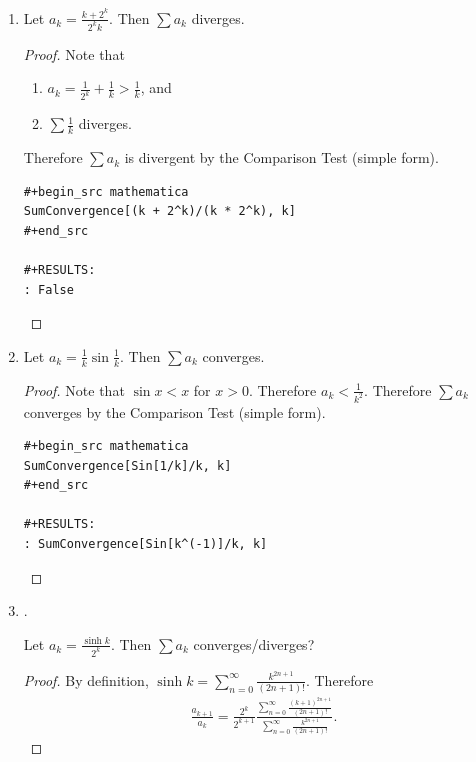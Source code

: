 \documentclass[12pt]{article}
\begin{document}
\begin{enumerate}[label=(\alph*)]
\item
  \begin{claim*}
    Let $a_k = \frac{k + 2^k}{2^kk}$. Then $\sum a_k$ diverges.
  \end{claim*}
  \begin{proof}
    Note that
    \begin{enumerate}
    \item $a_k = \frac{1}{2^k} + \frac{1}{k} > \frac{1}{k}$, and
    \item $\sum \frac{1}{k}$ diverges.
    \end{enumerate}
    Therefore $\sum a_k$ is divergent by the Comparison Test (simple form).

\begin{verbatim}
#+begin_src mathematica
SumConvergence[(k + 2^k)/(k * 2^k), k]
#+end_src

#+RESULTS:
: False
\end{verbatim}
\checkmark
  \end{proof}

\newpage
\item
  \begin{claim*}
    Let $a_k = \frac{1}{k}\sin\frac{1}{k}$. Then $\sum a_k$ converges.
  \end{claim*}
  \begin{proof}
    Note that $\sin x < x$ for $x > 0$. Therefore $a_k < \frac{1}{k^2}$. Therefore $\sum a_k$
    converges by the Comparison Test (simple form).

\begin{verbatim}
#+begin_src mathematica
SumConvergence[Sin[1/k]/k, k]
#+end_src

#+RESULTS:
: SumConvergence[Sin[k^(-1)]/k, k]

\end{verbatim}


  \end{proof}


\newpage
\item {}.


  \begin{claim*}
    Let $a_k = \frac{\sinh k}{2^k}$. Then $\sum a_k$ converges/diverges?
  \end{claim*}

  \begin{proof}
    By definition, $\sinh k = \sum_{n=0}^\infty \frac{k^{2n+1}}{(2n+1)!}$. Therefore
    \begin{align*}
      \frac{a_{k+1}}{a_k} =
      \frac{2^k}{2^{k+1}}\frac
      {\sum_{n=0}^\infty \frac{(k+1)^{2n+1}}{(2n+1)!}}
      {\sum_{n=0}^\infty \frac{k^{2n+1}}{(2n+1)!}}.
    \end{align*}


\end{proof}
\end{enumerate}
\end{document}
